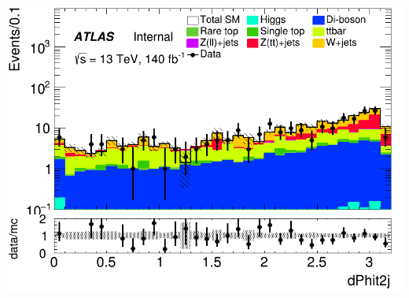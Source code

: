 \documentclass[usenames,dvipsnames]{beamer}
\begin{document}
\begin{frame}
\begin{minipage}{0.32\textwidth}
        \includegraphics[width=\textwidth]{graphics/LHH_met/LHH_met_dPhit2j.png}
    \end{minipage}
    
    \vspace{0.5cm} %


\end{frame}
\end{document}
